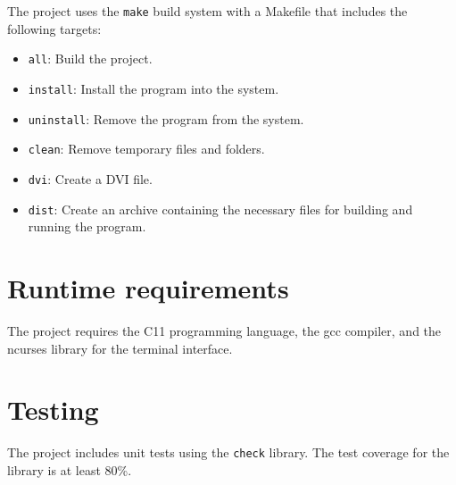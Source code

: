 \documentclass{article}
\begin{document}
The project uses the \texttt{make} build system with a Makefile that includes the following targets:

\begin{itemize}
    \item \texttt{all}: Build the project.
    \item \texttt{install}: Install the program into the system.
    \item \texttt{uninstall}: Remove the program from the system.
    \item \texttt{clean}: Remove temporary files and folders.
    \item \texttt{dvi}: Create a DVI file.
    \item \texttt{dist}: Create an archive containing the necessary files for building and running the program.
\end{itemize}

\section{Runtime requirements}

The project requires the C11 programming language, the gcc compiler, and the ncurses library for the terminal interface.

\section{Testing}

The project includes unit tests using the \texttt{check} library. The test coverage for the library is at least 80\%.
\end{document}
